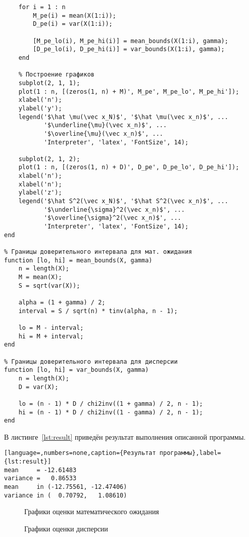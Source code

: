\begin{lstlisting}[caption={Текст программы},label={lst:programm}]
    % Заполнение созданных массивов
    for i = 1 : n
        M_pe(i) = mean(X(1:i));
        D_pe(i) = var(X(1:i));

        [M_pe_lo(i), M_pe_hi(i)] = mean_bounds(X(1:i), gamma);
        [D_pe_lo(i), D_pe_hi(i)] = var_bounds(X(1:i), gamma);
    end

    % Построение графиков
    subplot(2, 1, 1);
    plot(1 : n, [(zeros(1, n) + M)', M_pe', M_pe_lo', M_pe_hi']);
    xlabel('n');
    ylabel('y');
    legend('$\hat \mu(\vec x_N)$', '$\hat \mu(\vec x_n)$', ...
           '$\underline{\mu}(\vec x_n)$', ...
           '$\overline{\mu}(\vec x_n)$', ...
           'Interpreter', 'latex', 'FontSize', 14);

    subplot(2, 1, 2);
    plot(1 : n, [(zeros(1, n) + D)', D_pe', D_pe_lo', D_pe_hi']);
    xlabel('n');
    xlabel('n');
    ylabel('z');
    legend('$\hat S^2(\vec x_N)$', '$\hat S^2(\vec x_n)$', ...
           '$\underline{\sigma}^2(\vec x_n)$', ...
           '$\overline{\sigma}^2(\vec x_n)$', ...
           'Interpreter', 'latex', 'FontSize', 14);
end

% Границы доверительного интервала для мат. ожидания
function [lo, hi] = mean_bounds(X, gamma)
    n = length(X);
    M = mean(X);
    S = sqrt(var(X));

    alpha = (1 + gamma) / 2;
    interval = S / sqrt(n) * tinv(alpha, n - 1);

    lo = M - interval;
    hi = M + interval;
end

% Границы доверительного интервала для дисперсии
function [lo, hi] = var_bounds(X, gamma)
    n = length(X);
    D = var(X);

    lo = (n - 1) * D / chi2inv((1 + gamma) / 2, n - 1);
    hi = (n - 1) * D / chi2inv((1 - gamma) / 2, n - 1);
end
\end{lstlisting}

В листинге~\ref{lst:result} приведён результат выполнения описанной программы.
\begin{lstlisting}[language=,numbers=none,caption={Результат программы},label={lst:result}]
mean     = -12.61483
variance =   0.86533
mean     in (-12.75561, -12.47406)
variance in (  0.70792,   1.08610)
\end{lstlisting}

\begin{figure}[H]
    \caption{Графики оценки математического ожидания}\label{img:plot01}

    
\end{figure}

\begin{figure}[H]
    \caption{Графики оценки дисперсии}\label{img:plot02}
    
\end{figure}

